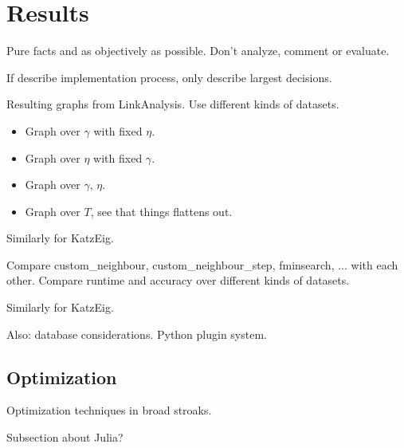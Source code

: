 \chapter{Results}\label{cha:Results}

Pure facts and as objectively as possible. Don't analyze, comment or evaluate.

If describe implementation process, only describe largest decisions.

Resulting graphs from LinkAnalysis. Use different kinds of datasets.

\begin{itemize}
    \item Graph over $\gamma$ with fixed $\eta$.
    \item Graph over $\eta$ with fixed $\gamma$.
    \item Graph over $\gamma$, $\eta$.
    \item Graph over $T$, see that things flattens out.
\end{itemize}

Similarly for KatzEig.


Compare custom\_neighbour, custom\_neighbour\_step, fminsearch, ... with each other. Compare runtime and accuracy over different kinds of datasets.

Similarly for KatzEig.

Also: database considerations. Python plugin system.

\section{Optimization}

Optimization techniques in broad stroaks.

Subsection about Julia?


%
%
%
